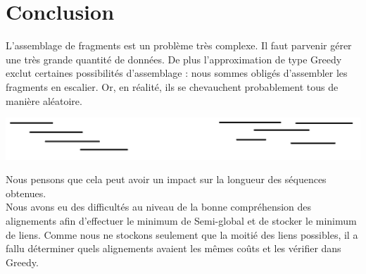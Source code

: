 \documentclass{article}
\begin{document}
\newpage
\section{Conclusion}
L'assemblage de fragments est un problème très complexe. Il faut parvenir gérer une très grande quantité de données. De plus l'approximation de type Greedy exclut certaines possibilités d'assemblage : nous sommes obligés d'assembler les fragments en escalier. Or, en réalité, ils se chevauchent probablement tous de manière aléatoire.  \\
\begin{center}
\includegraphics[scale=0.5]{alignement1.png}
\end{center}

Nous pensons que cela peut avoir un impact sur la longueur des séquences obtenues. \\

Nous avons eu des difficultés au niveau de la bonne compréhension des alignements afin d'effectuer le minimum de Semi-global et de stocker le minimum de liens. Comme nous ne stockons seulement que la moitié des liens possibles, il a fallu déterminer quels alignements avaient les mêmes coûts et les vérifier dans Greedy.
\end{document}
